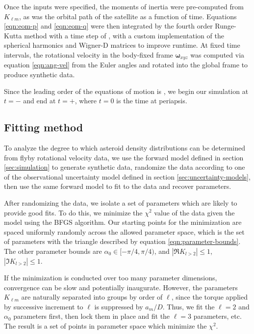 \documentclass[11pt]{article}
\begin{document}
Once the inputs were specified, the moments of inertia were pre-computed from $K_{\ell m}$, as was the orbital path of the satellite as a function of time. Equations \ref{eqn:eom-p} and \ref{eqn:eom-q} were then integrated by the fourth order Runge-Kutta method with a time step of , with a custom implementation of the spherical harmonics and Wigner-D matrices to improve runtime. At fixed time intervals, the rotational velocity in the body-fixed frame $\bm\omega_{xyz}$ was computed via equation \ref{eqn:ang-vel} from the Euler angles and rotated into the global frame to produce synthetic data.

Since the leading order of the equations of motion is , we begin our simulation at $t=-$  and end at $t=+$, where $t=0$ is the time at periapsis.



\subsection{Fitting method}
To analyze the degree to which asteroid density distributions can be determined from flyby rotational velocity data, we use the forward model defined in section \ref{sec:simulation} to generate synthetic data, randomize the data according to one of the observational uncertainty model defined in section \ref{sec:uncertainty-models}, then use the same forward model to fit to the data and recover parameters.

After randomizing the data, we isolate a set of parameters which are likely to provide good fits. To do this, we minimize the $\chi^2$ value of the data given the model using the BFGS algorithm. Our starting points for the minimization are spaced uniformly randomly across the allowed parameter space, which is the set of parameters with the triangle described by equation \ref{eqn:parameter-bounds}. The other parameter bounds are $\alpha_0 \in [-\pi/4, \pi/4)$, and $|\Re K_{l>2}| \leq  1$, $|\Im K_{l>2}| \leq  1$.

If the minimization is conducted over too many parameter dimensions, convergence can be slow and potentially inaugurate. However, the parameters $K_{\ell m}$ are naturally separated into groups by order of $\ell$, since the torque applied by successive increment to $\ell$ is suppressed by $a_m/D$. Thus, we fit the $\ell=2$ and $\alpha_0$ parameters first, then lock them in place and fit the $\ell=3$ parameters, etc. The result is a set of points in parameter space which minimize the $\chi^2$.
\end{document}
